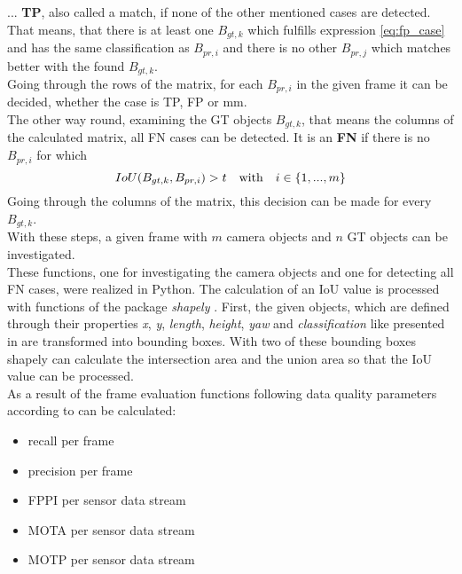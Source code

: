 ... \textbf{TP}, also called a match, if none of the other mentioned cases are detected. That means, that there is at least one $B_{gt,k}$ which fulfills expression \cref{eq:fp_case} and has the same classification as $B_{pr,i}$ and there is no other $B_{pr,j}$ which matches better with the found $B_{gt,k}$. \\

Going through the rows of the matrix, for each $B_{pr,i}$ in the given frame it can be decided, whether the case is TP, FP or mm. \\

The other way round, examining the \ac{GT} objects $B_{gt,k}$, that means the columns of the calculated matrix, all FN cases can be detected. It is an \textbf{FN} if there is no $B_{pr,i}$ for which
\begin{equation}
	IoU(B_{gt,k}, B_{pr,i}) > t \text{\quad with\quad} i \in \left\lbrace 1, ..., m\right\rbrace 
	\label{eq:fn_case}
\end{equation}
Going through the columns of the matrix, this decision can be made for every $B_{gt,k}$. \\
With these steps, a given frame with $m$ camera objects and $n$ \ac{GT} objects can be investigated. \\

These functions, one for investigating the camera objects and one for detecting all FN cases, were realized in Python. The calculation of an IoU value is processed with functions of the package \textit{shapely} \cite{Shapely}.
First, the given objects, which are defined through their properties \textit{x}, \textit{y}, \textit{length}, \textit{height}, \textit{yaw} and \textit{classification} like presented in \cite{Aeberhard}
are transformed into bounding boxes. With two of these bounding boxes shapely can calculate the intersection area and the union area so that the IoU value can be processed. \\

As a result of the frame evaluation functions following data quality parameters according to \cite{Reway} can be calculated:
\begin{itemize}
	
	\item recall per frame
	\item precision per frame
	\item FPPI per sensor data stream 
	\item MOTA per sensor data stream 
	\item MOTP per sensor data stream 
	
\end{itemize}

